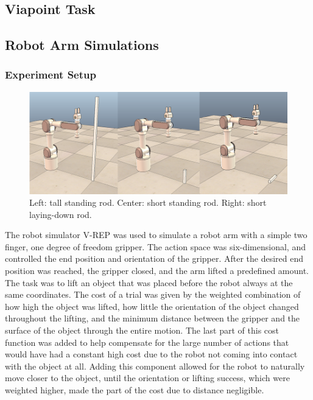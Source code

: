 \documentclass[12pt]{article}
\begin{document}
\subsection{Viapoint Task}

\subsection{Robot Arm Simulations}
\subsubsection{Experiment Setup}

\begin{figure}[ht]
  \centering
  \includegraphics[width=0.9\columnwidth]{robots.png}
  \caption{\label{fig_robots} Left: tall standing rod. Center: short standing rod. Right: short laying-down rod.
  \label{fig:robots}
  }
\end{figure}

The robot simulator V-REP was used to simulate a robot arm with a simple two finger, one degree of freedom gripper. The action space was six-dimensional, and controlled the end position and orientation of the gripper. After the desired end position was reached, the gripper closed, and the arm lifted a predefined amount. The task was to lift an object that was placed before the robot always at the same coordinates. The cost of a trial was given by the weighted combination of how high the object was lifted, how little the orientation of the object changed throughout the lifting, and the minimum distance between the gripper and the surface of the object through the entire motion. The last part of this cost function was added to help compensate for the large number of actions that would have had a constant high cost due to the robot not coming into contact with the object at all. Adding this component allowed for the robot to naturally move closer to the object, until the orientation or lifting success, which were weighted higher, made the part of the cost due to distance negligible. 
\end{document}

